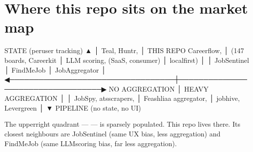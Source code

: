 \documentclass[a4paper,11pt,english]{sphinxmanual}
\begin{document}
\section{Where this repo sits on the market map}
\label{\detokenize{analysis:where-this-repo-sits-on-the-market-map}}
\begin{sphinxVerbatim}[commandchars=\\\{\}]
                            STATE (per\PYGZhy{}user tracking)
                                      ▲
                                      │
                 Teal, Huntr,         │       THIS REPO
                 Careerflow,          │       (147 boards,
                 Careerkit            │        LLM scoring,
                 (SaaS, consumer)     │        local\PYGZhy{}first)
                                      │
                                      │       JobSentinel
                                      │       Find\PYGZhy{}Me\PYGZhy{}Job
                                      │       JobAggregator
                                      │
   ◀──────────────────────────────────┼──────────────────────────────────▶
   NO AGGREGATION                     │                      HEAVY AGGREGATION
                                      │
                                      │       JobSpy, ats\PYGZhy{}scrapers,
                                      │       Feashliaa aggregator,
                                      │       jobhive, Levergreen
                                      │
                                      ▼
                            PIPELINE (no state, no UI)
\end{sphinxVerbatim}

\sphinxAtStartPar
The upper\sphinxhyphen{}right quadrant —  — is sparsely populated. This repo lives there.
Its closest neighbours are JobSentinel (same UX bias, less aggregation)
and Find\sphinxhyphen{}Me\sphinxhyphen{}Job (same LLM\sphinxhyphen{}scoring bias, far less aggregation).
\end{document}
